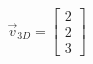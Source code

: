 \documentclass[preview]{standalone}
\begin{document}
\begin{align*}
\vec{v}_{3D} = \begin{bmatrix} 2 \\ 2 \\ 3 \end{bmatrix}
\end{align*}
\end{document}

